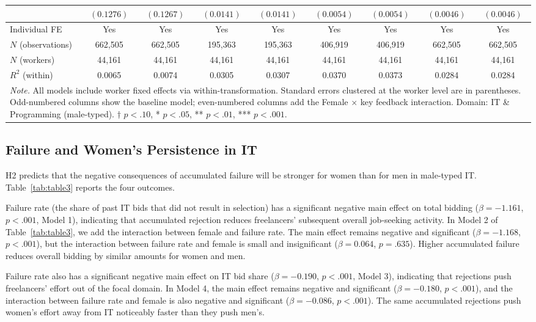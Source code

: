 \documentclass[12pt]{article}
\begin{document}
\begin{table}
\begin{tabular}{lcccccccc}
  & $(0.1276)$ & $(0.1267)$ & $(0.0141)$ & $(0.0141)$ & $(0.0054)$ & $(0.0054)$ & $(0.0046)$ & $(0.0046)$ \\[4pt]
\hline
Individual FE & Yes & Yes & Yes & Yes & Yes & Yes & Yes & Yes \\
$N$ (observations) & 662,505 & 662,505 & 195,363 & 195,363 & 406,919 & 406,919 & 662,505 & 662,505 \\
$N$ (workers) & 44,161 & 44,161 & 44,161 & 44,161 & 44,161 & 44,161 & 44,161 & 44,161 \\
$R^2$ (within) & 0.0065 & 0.0074 & 0.0305 & 0.0307 & 0.0370 & 0.0373 & 0.0284 & 0.0284 \\
\hline\hline
\multicolumn{9}{p{0.95\textheight}}{
\footnotesize \textit{Note.} All models include worker fixed effects via within-transformation. Standard errors clustered at the worker level are in parentheses. Odd-numbered columns show the baseline model; even-numbered columns add the Female $\times$ key feedback interaction. Domain: IT \& Programming (male-typed). $\dagger$ $p < .10$, * $p < .05$, ** $p < .01$, *** $p < .001$.
} \\
\end{tabular}
\end{table}







\subsection{Failure and Women's Persistence in IT}

H2 predicts that the negative consequences of accumulated failure will be stronger for women than for men in male-typed IT. Table~\ref{tab:table3} reports the four outcomes.

Failure rate (the share of past IT bids that did not result in selection) has a significant negative main effect on total bidding ($\beta = -1.161$, $p < .001$, Model 1), indicating that accumulated rejection reduces freelancers' subsequent overall job-seeking activity. In Model 2 of Table~\ref{tab:table3}, we add the interaction between female and failure rate. The main effect remains negative and significant ($\beta = -1.168$, $p < .001$), but the interaction between failure rate and female is small and insignificant ($\beta = 0.064$, $p = .635$). Higher accumulated failure reduces overall bidding by similar amounts for women and men.

Failure rate also has a significant negative main effect on IT bid share ($\beta = -0.190$, $p < .001$, Model 3), indicating that rejections push freelancers' effort out of the focal domain. In Model 4, the main effect remains negative and significant ($\beta = -0.180$, $p < .001$), and the interaction between failure rate and female is also negative and significant ($\beta = -0.086$, $p < .001$). The same accumulated rejections push women's effort away from IT noticeably faster than they push men's.
\end{document}

